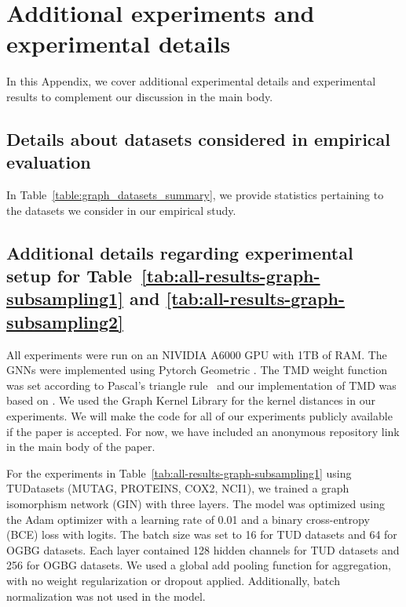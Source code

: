 \section{Additional experiments and experimental details}\label{sec:additional-background-experiments}

In this Appendix, we cover additional experimental details and experimental results to complement our discussion in the main body. 

\subsection{Details about datasets considered in empirical evaluation}\label{sec:dataset_details}

In Table~\ref{table:graph_datasets_summary}, we provide statistics pertaining to the datasets we consider in our empirical study. 

\subsection{Additional details regarding experimental setup for Table~\ref{tab:all-results-graph-subsampling1} and \ref{tab:all-results-graph-subsampling2}}\label{sec:additional-experiment-details}

All experiments were run on an NIVIDIA A6000 GPU with 1TB of RAM. The GNNs were implemented using Pytorch Geometric \citep{he2024pytorch}.  The TMD weight function was set according to Pascal's triangle rule~\citep[][Theorem 8]{Chuang22:Tree} and our implementation of TMD was based on \citet{Chuang22:Tree}. We used the Graph Kernel Library \citep{siglidis2020grakel} for the kernel distances in our experiments.  We will make the code for all of our experiments publicly available if the paper is accepted. For now, we have included an anonymous repository link in the main body of the paper. 

For the experiments in Table~\ref{tab:all-results-graph-subsampling1} using TUDatasets \citep{morris2020tudataset} (MUTAG, PROTEINS, COX2, NCI1), we trained a graph isomorphism network (GIN) with three layers. The model was optimized using the Adam optimizer with a learning rate of 0.01 and a binary cross-entropy (BCE) loss with logits. The batch size was set to 16 for TUD datasets and 64 for OGBG datasets. Each layer contained 128 hidden channels for TUD datasets and 256 for OGBG datasets. We used a global add pooling function for aggregation, with no weight regularization or dropout applied. Additionally, batch normalization was not used in the model.








